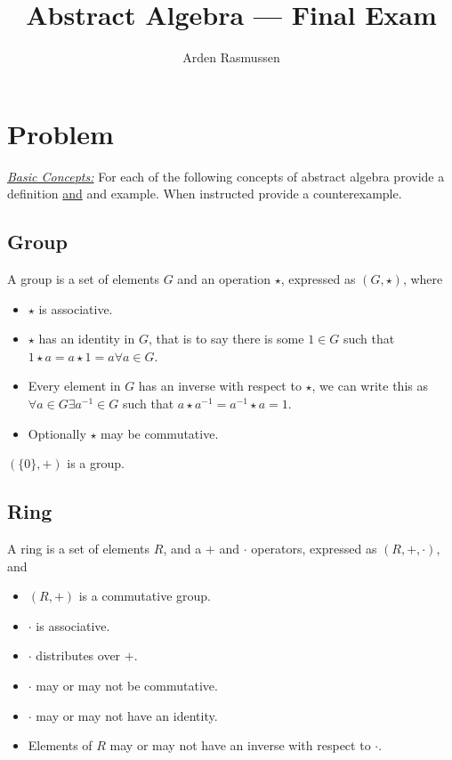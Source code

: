 \documentclass[10pt]{amsart}
\title{Abstract Algebra --- Final Exam}
\author{Arden Rasmussen}
\begin{document}
\maketitle

\section{Problem}%
\label{sec:problem_1}

\underline{\textit{Basic Concepts:}} For each of the following concepts of
abstract algebra provide a definition \underline{and} and example. When
instructed provide a counterexample.

\subsection{Group}%
\label{sub:group}

A group is a set of elements $G$ and an operation $\star$, expressed as
$(G,\star)$, where
\begin{itemize}
  \item  $\star$ is associative.
  \item $\star$ has an identity in $G$, that is to say there is some $1\in G$
    such that $1\star a=a\star 1=a\forall a\in G$.
  \item Every element in $G$ has an inverse with respect to $\star$, we can
    write this as $\forall a\in G\exists a^{-1}\in G$ such that $a\star
    a^{-1}=a^{-1}\star a=1$.
  \item Optionally $\star$ may be commutative.
\end{itemize}

$(\{0\},+)$ is a group.

\subsection{Ring}%
\label{sub:ring}

A ring is a set of elements $R$, and a $+$ and $\cdot$ operators, expressed as
$(R,+,\cdot)$, and
\begin{itemize}
  \item $(R,+)$ is a commutative group.
  \item $\cdot$ is associative.
  \item $\cdot$ distributes over $+$.
  \item $\cdot$ may or may not be commutative.
  \item $\cdot$ may or may not have an identity.
  \item Elements of $R$ may or may not have an inverse with respect to
    $\cdot$.
\end{itemize}
\end{document}
